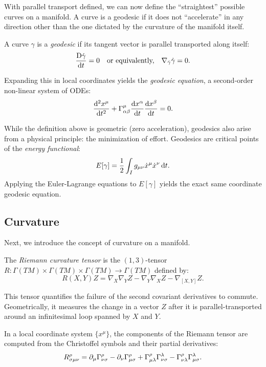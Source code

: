 With parallel transport defined, we can now define the ``straightest'' possible curves on a manifold. A curve is a geodesic if it does not ``accelerate'' in any direction other than the one dictated by the curvature of the manifold itself.

\begin{definition}
  A curve $\gamma$ is a \emph{geodesic} if its tangent vector is parallel transported along itself:
  \[%
    \codv{\dot{\gamma}}{t} = 0 \quad \text{or equivalently,} \quad \nabla_{\dot{\gamma}} \dot{\gamma} = 0
  .\]%
\end{definition}

Expanding this in local coordinates yields the \emph{geodesic equation}, a second-order non-linear system of ODEs:
\[%
  \odv[2]{x^\mu}{t} + \Gamma^\mu_{\alpha\beta} \odv{x^\alpha}{t} \odv{x^\beta}{t} = 0
.\]%

While the definition above is geometric (zero acceleration), geodesics also arise from a physical principle: the minimization of effort. Geodesics are critical points of the \emph{energy functional}:
\[%
  E[\gamma] = \frac{1}{2} \int_I g_{\mu\nu} \dot{x}^\mu \dot{x}^\nu \dt
.\]%
Applying the Euler-Lagrange equations to $E[\gamma]$ yields the exact same coordinate geodesic equation.

\subsection{Curvature}
\label{sub_sec:curvature}
Next, we introduce the concept of curvature on a manifold.

\begin{definition}
  The \emph{Riemann curvature tensor} is the $(1,3)$-tensor $R: \Gamma(TM) \times \Gamma(TM) \times \Gamma(TM) \to \Gamma(TM)$ defined by:
  \begin{equation}
    R(X,Y)Z = \nabla_X \nabla_Y Z - \nabla_Y \nabla_X Z - \nabla_{[X,Y]} Z
  .\end{equation}
\end{definition}

This tensor quantifies the failure of the second covariant derivatives to commute. Geometrically, it measures the change in a vector $Z$ after it is parallel-transported around an infinitesimal loop spanned by $X$ and $Y$.

In a local coordinate system $\{x^\mu\}$, the components of the Riemann tensor are computed from the Christoffel symbols and their partial derivatives:
\[%
  R^\rho_{\sigma\mu\nu} = \pd{\mu} \Gamma^\rho_{\nu\sigma} - \pd{\nu} \Gamma^\rho_{\mu\sigma} + \Gamma^\rho_{\mu\lambda} \Gamma^\lambda_{\nu\sigma} - \Gamma^\rho_{\nu\lambda} \Gamma^\lambda_{\mu\sigma}
.\]%

